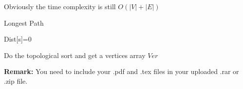 \documentclass[12pt,a4paper]{article}
\theoremstyle{definition}
\begin{document}
\begin{enumerate}
\begin{enumerate}
       	Obviously  the time complexity is still $O(|V|+|E|)$
       	
       		\begin{minipage}[t]{0.8\textwidth}
       		\begin{algorithm}[H]
       			
       			\BlankLine
       			\caption{Longest Path}\label{Alg_Quick}
       			
       			
       			Dist[s]=0\;
       			
       			Do the topological sort and get a vertices array $Ver$ \;
       			
       			
       			
       		\end{algorithm}
       	\end{minipage}
       	
       	
       	
       \end{enumerate}
    
    
    
\end{enumerate}

\vspace{20pt}

\textbf{Remark:} You need to include your .pdf and .tex files in your uploaded .rar or .zip file.

\end{document}
